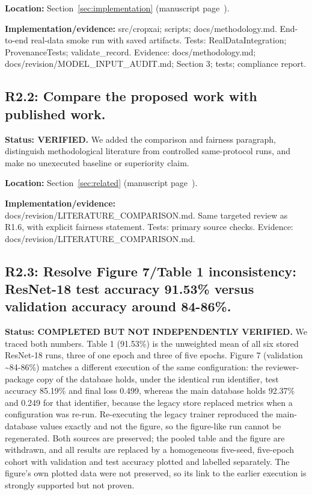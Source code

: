 \documentclass[3p,times,procedia]{elsarticle}
\begin{document}
\par\textbf{Location:} Section~\ref{sec:implementation} (manuscript page~\pageref{sec:implementation}).

\par\textbf{Implementation/evidence:} src/cropxai; scripts; docs/methodology.md. End-to-end real-data smoke run with saved artifacts. Tests: RealDataIntegration; ProvenanceTests; validate\_record. Evidence: docs/methodology.md; docs/revision/MODEL\_INPUT\_AUDIT.md; Section 3; tests; compliance report.

\subsection*{R2.2: Compare the proposed work with published work.}

\textbf{Status: VERIFIED.} We added the comparison and fairness paragraph, distinguish methodological literature from controlled same-protocol runs, and make no unexecuted baseline or superiority claim.

\par\textbf{Location:} Section~\ref{sec:related} (manuscript page~\pageref{sec:related}).

\par\textbf{Implementation/evidence:} docs/revision/LITERATURE\_COMPARISON.md. Same targeted review as R1.6, with explicit fairness statement. Tests: primary source checks. Evidence: docs/revision/LITERATURE\_COMPARISON.md.

\subsection*{R2.3: Resolve Figure 7/Table 1 inconsistency: ResNet-18 test accuracy 91.53\% versus validation accuracy around 84-86\%.}

\textbf{Status: COMPLETED BUT NOT INDEPENDENTLY VERIFIED.} We traced both numbers. Table 1 (91.53\%) is the unweighted mean of all six stored ResNet-18 runs, three of one epoch and three of five epochs. Figure 7 (validation \textasciitilde{}84-86\%) matches a different execution of the same configuration: the reviewer-package copy of the database holds, under the identical run identifier, test accuracy 85.19\% and final loss 0.499, whereas the main database holds 92.37\% and 0.249 for that identifier, because the legacy store replaced metrics when a configuration was re-run. Re-executing the legacy trainer reproduced the main-database values exactly and not the figure, so the figure-like run cannot be regenerated. Both sources are preserved; the pooled table and the figure are withdrawn, and all results are replaced by a homogeneous five-seed, five-epoch cohort with validation and test accuracy plotted and labelled separately. The figure's own plotted data were not preserved, so its link to the earlier execution is strongly supported but not proven.
\end{document}
